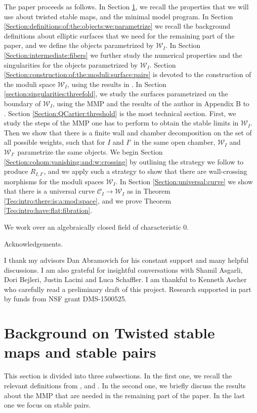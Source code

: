 \documentclass[11pt]{amsart}
\newcommand{\cE}{\mathcal{W}}
\newcommand{\sC}{\mathscr{C}}
\theoremstyle{definition}
\begin{document}
The paper proceeds as follows. In Section
\ref{Section:background:tsm:and:stable:pairs}, we recall the properties that we will use about twisted stable maps, and the minimal model program. In Section \ref{Section:definitions:of:the:objects:we:parametrize} we recall the background definitions about elliptic surfaces that we need for the remaining part of the paper, and we define the objects parametrized by $\cE_{I}$.
In Section \ref{Section:intermediate:fibers} 
we further study the numerical properties and the singularities for the objects parametrized by $\cE_I$.
Section \ref{Section:construction:of:the:moduli:surface:pairs} is devoted to the construction of the moduli space $\cE_I$, using the results in \cite{KP}.
In Section \ref{section:singularities:threefold}, we study the surfaces parametrized on the boundary of $\cE_I$, using the MMP and the results of the author in Appendix B to \cite{AB3}. Section
\ref{Section:QCartier:threshold} is the most technical section. First, we study the steps of the MMP one has to perform to obtain the stable limits in $\cE_I$. Then we show that there is a finite wall and chamber decomposition on the set of all possible weights, such that for $I$ and $I'$ in the same open chamber, $\cE_I$ and $\cE_{I'}$ parametrize the same objects. We begin Section \ref{Section:cohom:vanishing:and:w:crossing} by outlining the strategy we follow to produce $R_{I,I'}$, and we apply such a strategy to show that there are wall-crossing morphisms for the moduli spaces $\cE_I$.
In Section \ref{Section:universal:curve} we show that there is a universal curve $\sC_I \to \cE_I$ as in Theorem \ref{Teo:intro:there:is:a:mod:space}, and we prove Theorem \ref{Teo:intro:have:flat:fibration}.


We work over an algebraically closed field of characteristic 0. 

\begin{bf}Acknowledgements. \end{bf} I thank my advisors Dan Abramovich for his constant support and many helpful discussions. I am also grateful for insightful
conversations with Shamil Asgarli, Dori Bejleri, Justin Lacini and Luca Schaffler. I am thankful to Kenneth Ascher who carefully read a preliminary draft of this project.  Research supported in part by funds from
NSF grant DMS-1500525.
\section{Background on Twisted stable maps and stable pairs}\label{Section:background:tsm:and:stable:pairs}
This section is divided into three subsections.
In the first one, we recall the relevant definitions from \cite{AV1}, \cite{AOV} and \cite{AV2}. In the second one, we briefly discuss
the results about the
MMP that are needed in the remaining part of the paper. In the last one we focus on stable pairs.
\end{document}
